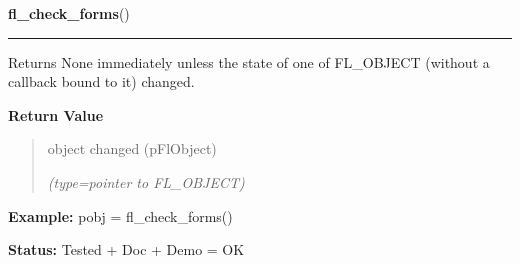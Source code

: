     \label{xformslib:flbasic:fl_check_forms}

    \vspace{0.5ex}

\hspace{.8\funcindent}\begin{boxedminipage}{\funcwidth}

    \raggedright \textbf{fl\_check\_forms}()

    \vspace{-1.5ex}

    \rule{\textwidth}{0.5\fboxrule}
\setlength{\parskip}{2ex}
    Returns None immediately unless the state of one of FL\_OBJECT (without
    a callback bound to it) changed.

\setlength{\parskip}{1ex}
      \textbf{Return Value}
    \vspace{-1ex}

      \begin{quote}
      object changed (pFlObject)

      {\it (type=pointer to FL\_OBJECT)}

      \end{quote}

\textbf{Example:} pobj = fl\_check\_forms()



\textbf{Status:} Tested + Doc + Demo = OK



    \end{boxedminipage}

    \label{xformslib:flbasic:fl_do_only_forms}

    \vspace{0.5ex}

